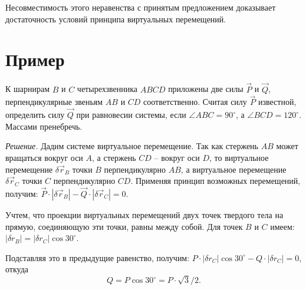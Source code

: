 Несовместимость этого неравенства с принятым предложением доказывает
достаточность условий принципа виртуальных перемещений.

\section{Пример}
К шарнирам \( B \) и \( C \) четырехзвенника \( ABCD \) приложены две силы
\( \vec{P} \) и \( \vec{Q} \), перпендикулярные звеньям \( AB \) и \( CD \)
соответственно. Считая силу \( \vec{P} \) известной, определить силу
\( \vec{Q} \) при равновесии системы, если \( \angle ABC = 90^\circ \), а
\( \angle BCD = 120^\circ \). Массами пренебречь.

\emph{Решение.} Дадим системе виртуальное перемещение. Так как стержень \( AB \)
может вращаться вокруг оси \( A \), а стержень \( CD \) -- вокруг оси \( D \),
то виртуальное перемещение \( \delta\vec{r}_B \) точки \( B \) перпендикулярно
\( AB \), а виртуальное перемещение \( \delta\vec{r}_C \) точки \( C \)
перпендикулярно \( CD \). Применяя принцип возможных перемещений, получим:
\( \vec{P}\cdot|\delta\vec{r}_B| - \vec{Q}\cdot|\delta\vec{r}_C| = 0 \).

Учтем, что проекции виртуальных перемещений двух точек твердого тела на прямую,
соединяющую эти точки, равны между собой. Для точек \( B \) и \( C \) имеем:
\( |\delta r_B| = |\delta r_C|\cos 30^\circ \).

Подставляя это в предыдущие равенство, получим:
\( P\cdot|\delta r_C|\cos 30^\circ - Q\cdot|\delta r_C| = 0 \), откуда
\[
    Q = P\cos 30^\circ = P\cdot\sqrt{3}/2.
\]

\newpage %
